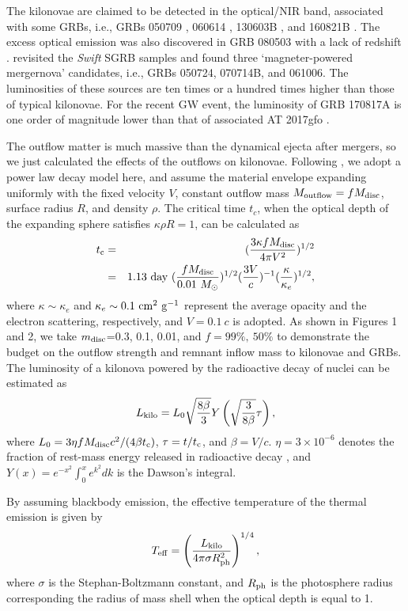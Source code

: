 \documentclass[a4paper,fleqn,usenatbib]{mnras}
\def\beq{\begin{eqnarray}}
\def\eeq{\end{eqnarray}}
\begin{document}
The kilonovae are claimed to be detected in the optical/NIR band, associated with some GRBs, i.e., GRBs 050709 \citep[]{Jin2016}, 060614 \citep[]{Yang2015,Jin2015,Horesh2016}, 130603B \citep[]{Tanvir2013,Berger2013a,Fan2013}, and 160821B \citep[]{Kasliwal2017}. The excess optical emission was also discovered in GRB 080503 with a lack of redshift \citep[]{Perley2009}. \citet[]{Gao2017b} revisited the \textit{Swift} SGRB samples and found three `magneter-powered mergernova' candidates, i.e., GRBs 050724, 070714B, and 061006. The luminosities of these sources are ten times or a hundred times higher than those of typical kilonovae. For the recent GW event, the luminosity of GRB 170817A is one order of magnitude lower than that of associated AT 2017gfo \citep[e.g.,][]{Smartt2017}.

The outflow matter is much massive than the dynamical ejecta after mergers, so we just calculated the effects of the outflows on kilonovae. Following \citet[]{Li1998}, we adopt a power law decay model here, and assume the material envelope expanding uniformly with the fixed velocity $V$, constant outflow mass $M_{\rm outflow}=fM_{\rm disc}$, surface radius $R$, and density $\rho$. The critical time $t_{c}$, when the optical depth of the expanding sphere satisfies $\kappa \rho R = 1$, can be calculated as
\beq
t_{\rm c}&=&(\frac{3\kappa fM_{\rm disc}}{4\pi V^{2}})^{1/2} \nonumber
\\&=&1.13~{\rm day}~(\frac{fM_{\rm disc}}{0.01~M_{\odot}})^{1/2}(\frac{3V}{c})^{-1}(\frac{\kappa}{\kappa_{e}})^{1/2},
\eeq
where $\kappa \sim \kappa_{e}$ and $\kappa_{e} \sim 0.1~\rm cm^{2}~ g^{-1}$ \citep[e.g.,][]{Metzger2010} represent the average opacity and the electron scattering, respectively, and $V = 0.1~c$ is adopted. As shown in Figures 1 and 2, we take $m_{\rm disc}$=0.3, 0.1, 0.01, and $f=99\%, ~50\%$ to demonstrate the budget on the outflow strength and remnant inflow mass to kilonovae and GRBs. The luminosity of a kilonova powered by the radioactive decay of nuclei can be estimated as
\beq
L_{\rm kilo}=L_{0}\sqrt{\frac{8\beta}{3}}Y\left (\sqrt{\frac{3}{8\beta}}\tau\right),
\eeq
where $L_{0}=3\eta fM_{\rm disc}c^{2}/(4\beta t_{\rm c})$, $\tau=t/t_{\rm c}$, and $\beta=V/c$. $\eta =3\times 10^{-6}$ denotes the fraction of rest-mass energy released in radioactive decay \citep[]{Metzger2010}, and $Y(x)=e^{-x^2}\int_0^x e^{k^2}dk$ is the Dawson's integral.

By assuming blackbody emission, the effective temperature of the thermal emission is given by
\beq
T_{\rm eff}=\left(\frac{L_{\rm kilo}}{4\pi\sigma R_{\rm ph}^2}\right)^{1/4},
\eeq
where $\sigma$ is the Stephan-Boltzmann constant, and $R_{\rm ph}$ is the photosphere radius corresponding the radius of mass shell when the optical depth is equal to 1.
\end{document}
